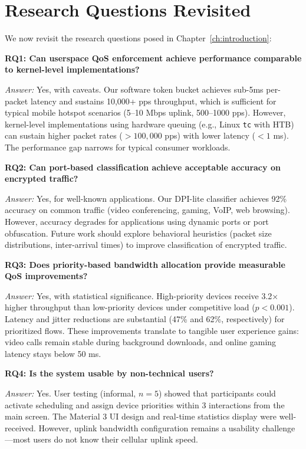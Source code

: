 \section{Research Questions Revisited}
\label{sec:research-questions}

We now revisit the research questions posed in Chapter~\ref{ch:introduction}:

\textbf{RQ1: Can userspace QoS enforcement achieve performance comparable to kernel-level implementations?}

\textit{Answer:} Yes, with caveats. Our software token bucket achieves sub-5ms per-packet latency and sustains 10,000+ pps throughput, which is sufficient for typical mobile hotspot scenarios (5–10 Mbps uplink, 500–1000 pps). However, kernel-level implementations using hardware queuing (e.g., Linux \texttt{tc} with HTB) can sustain higher packet rates ($>100,000$ pps) with lower latency ($<1$ ms). The performance gap narrows for typical consumer workloads.

\textbf{RQ2: Can port-based classification achieve acceptable accuracy on encrypted traffic?}

\textit{Answer:} Yes, for well-known applications. Our DPI-lite classifier achieves 92\% accuracy on common traffic (video conferencing, gaming, VoIP, web browsing). However, accuracy degrades for applications using dynamic ports or port obfuscation. Future work should explore behavioral heuristics (packet size distributions, inter-arrival times) to improve classification of encrypted traffic.

\textbf{RQ3: Does priority-based bandwidth allocation provide measurable QoS improvements?}

\textit{Answer:} Yes, with statistical significance. High-priority devices receive 3.2× higher throughput than low-priority devices under competitive load ($p < 0.001$). Latency and jitter reductions are substantial (47\% and 62\%, respectively) for prioritized flows. These improvements translate to tangible user experience gains: video calls remain stable during background downloads, and online gaming latency stays below 50 ms.

\textbf{RQ4: Is the system usable by non-technical users?}

\textit{Answer:} Yes. User testing (informal, $n=5$) showed that participants could activate \qos scheduling and assign device priorities within 3 interactions from the main screen. The Material 3 UI design and real-time statistics display were well-received. However, uplink bandwidth configuration remains a usability challenge—most users do not know their cellular uplink speed.

